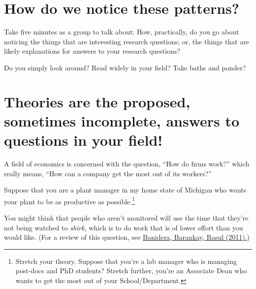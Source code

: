 \documentclass[
  letterpaper,
  DIV=11,
  numbers=noendperiod]{scrreprt}
\begin{document}
\section{How do we notice these
patterns?}\label{how-do-we-notice-these-patterns}

\begin{tcolorbox}[enhanced jigsaw, titlerule=0mm, colback=white, toptitle=1mm, toprule=.15mm, bottomtitle=1mm, colframe=quarto-callout-note-color-frame, colbacktitle=quarto-callout-note-color!10!white, bottomrule=.15mm, leftrule=.75mm, opacityback=0, title=\textcolor{quarto-callout-note-color}{\faInfo}\hspace{0.5em}{Breakout: Noticing Questions and Answers}, opacitybacktitle=0.6, arc=.35mm, rightrule=.15mm, breakable, coltitle=black, left=2mm]

Take five minutes as a group to talk about: How, practically, do you go
about noticing the things that are interesting research questions; or,
the things that are likely explanations for answers to your research
questions?

Do you simply look around? Read widely in your field? Take baths and
ponder?

\end{tcolorbox}

\section{Theories are the proposed, sometimes incomplete, answers to
questions in your
field!}\label{theories-are-the-proposed-sometimes-incomplete-answers-to-questions-in-your-field}

A field of economics is concerned with the question, ``How do firms
work?'' which really means, ``How can a company get the most out of its
workers?''

Suppose that you are a plant manager in my home state of Michigan who
wants your plant to be as productive as possible.\footnote{Stretch your
  theory. Suppose that you're a lab manager who is managing post-docs
  and PhD students? Stretch further, you're an Associate Dean who wants
  to get the most out of your School/Department.}

You might think that people who aren't monitored will use the time that
they're not being watched to \emph{shirk}, which is to do work that is
of lower effort than you would like. (For a review of this question, see
\href{./field_experiments_with_firms.pdf}{Banidera, Barankay, Rasul
(2011).})
\end{document}
